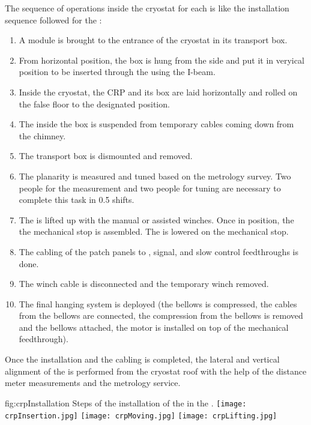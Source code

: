 The sequence of operations inside the cryostat for each  is like the installation sequence followed for the :
\begin{enumerate}
\item A  module is brought to the entrance of the cryostat in its transport box.
\item From horizontal position, the box is hung from the side and put it in veryical position to be inserted through the  using the  I-beam.
\item Inside the cryostat, the CRP and its box are laid horizontally and rolled on the false floor to the designated position.
\item The  inside the box is suspended from temporary cables coming down from the chimney.
\item The transport box is dismounted and removed.
\item The  planarity is measured and tuned based on the metrology survey.
Two people for the measurement and two people for tuning are necessary to complete this task in 0.5 shifts.
\item The  is lifted up with the manual or assisted winches. Once in position, the the mechanical stop is assembled. The  is lowered on the mechanical stop.
\item The cabling of the  patch panels to , signal, and slow control feedthroughs is done.
\item The winch cable is disconnected and the temporary winch removed.
\item The final hanging system is deployed (the bellows is compressed, the cables from the bellows are connected, the compression from the bellows is removed and the bellows attached, the motor is installed on top of the mechanical feedthrough).
\end{enumerate}
Once the installation and the cabling is completed, the lateral and vertical alignment of the  is performed from the cryostat roof with the help of the distance meter measurements and the metrology service.

\begin{dunefigure}{fig:crpInstallation}
{Steps of the installation of the  in the .}
\texttt{[image: crpInsertion.jpg]}
\texttt{[image: crpMoving.jpg]}
\texttt{[image: crpLifting.jpg]}
\end{dunefigure}

